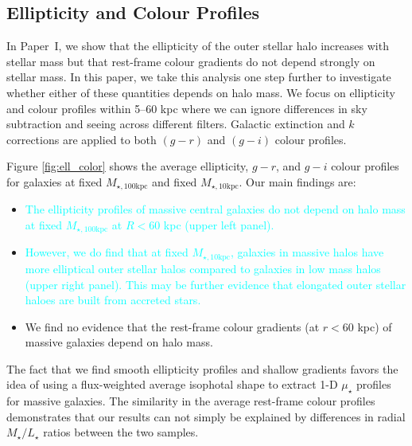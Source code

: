 \documentclass[a4paper,fleqn,usenatbib]{mnras}
\def\minn{{$M_{\star,10\mathrm{kpc}}$}}
\def\mtot{{$M_{\star,100\mathrm{kpc}}$}}
\def\m2l{{$M_{\star}/L_{\star}$}}
\def\mden{{$\mu_{\star}$}}
\newcommand{\song}[1]{\textcolor{cyan}{#1}}
\begin{document}
\subsection{Ellipticity and Colour Profiles}
    \label{ssec:ell_color}
    
    In Paper~I, we show that the ellipticity of the outer stellar halo increases with 
    stellar mass but that rest-frame colour gradients do not depend strongly on 
    stellar mass. 
    In this paper, we take this analysis one step further to investigate whether either 
    of these quantities depends on halo mass. 
    We focus on ellipticity and colour profiles within 5--60 kpc where we can ignore
    differences in sky subtraction and seeing across different filters. 
    Galactic extinction and $k$ corrections are applied to both $(g-r)$ and $(g-i)$ 
    colour profiles.
    
    Figure \ref{fig:ell_color} shows the average ellipticity, $g-r$, and $g-i$ colour 
    profiles for galaxies at fixed \mtot{} and fixed \minn{}. Our main findings are: 
    
    \begin{itemize}
    
        \item \song{
            The ellipticity profiles of massive central galaxies do not depend on 
            halo mass at fixed \mtot{} at $R<60$ kpc (upper left panel). 
            }       
                
        \item \song{
            However, we do find that at fixed \minn{}, galaxies in massive halos 
            have more elliptical outer stellar halos compared to galaxies in low mass 
            halos (upper right panel).
            This may be further evidence that elongated outer stellar haloes are 
            built from accreted stars.
            }
                     
        \item We find no evidence that the rest-frame colour gradients (at $r<60$ kpc) 
            of massive galaxies depend on halo mass. 
            
    \end{itemize}
    
    The fact that we find smooth ellipticity profiles and shallow gradients favors 
    the idea of using a flux-weighted average isophotal shape to extract 1-D \mden{} 
    profiles for massive galaxies. 
    The similarity in the average rest-frame colour profiles demonstrates that our 
    results can not simply be explained by differences in radial \m2l{} ratios between 
    the two samples.
    
\end{document}
